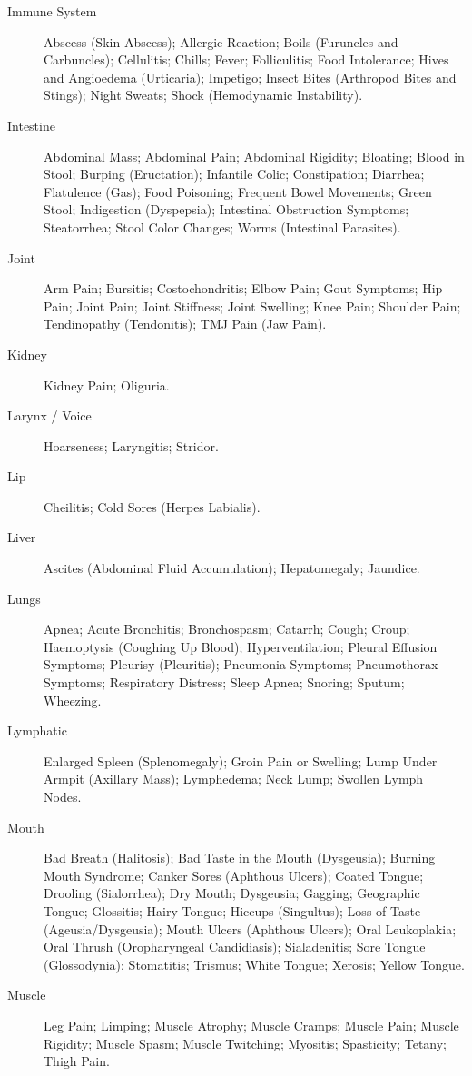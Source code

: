 \begin{description}
  \item[Immune System] Abscess (Skin Abscess); Allergic Reaction; Boils (Furuncles and Carbuncles); Cellulitis; Chills; Fever; Folliculitis; Food Intolerance; Hives and Angioedema (Urticaria); Impetigo; Insect Bites (Arthropod Bites and Stings); Night Sweats; Shock (Hemodynamic Instability).
  \item[Intestine] Abdominal Mass; Abdominal Pain; Abdominal Rigidity; Bloating; Blood in Stool; Burping (Eructation); Infantile Colic; Constipation; Diarrhea; Flatulence (Gas); Food Poisoning; Frequent Bowel Movements; Green Stool; Indigestion (Dyspepsia); Intestinal Obstruction Symptoms; Steatorrhea; Stool Color Changes; Worms (Intestinal Parasites).
  \item[Joint] Arm Pain; Bursitis; Costochondritis; Elbow Pain; Gout Symptoms; Hip Pain; Joint Pain; Joint Stiffness; Joint Swelling; Knee Pain; Shoulder Pain; Tendinopathy (Tendonitis); TMJ Pain (Jaw Pain).
  \item[Kidney] Kidney Pain; Oliguria.
  \item[Larynx / Voice] Hoarseness; Laryngitis; Stridor.
  \item[Lip] Cheilitis; Cold Sores (Herpes Labialis).
  \item[Liver] Ascites (Abdominal Fluid Accumulation); Hepatomegaly; Jaundice.
  \item[Lungs] Apnea; Acute Bronchitis; Bronchospasm; Catarrh; Cough; Croup; Haemoptysis (Coughing Up Blood); Hyperventilation; Pleural Effusion Symptoms; Pleurisy (Pleuritis); Pneumonia Symptoms; Pneumothorax Symptoms; Respiratory Distress; Sleep Apnea; Snoring; Sputum; Wheezing.
  \item[Lymphatic] Enlarged Spleen (Splenomegaly); Groin Pain or Swelling; Lump Under Armpit (Axillary Mass); Lymphedema; Neck Lump; Swollen Lymph Nodes.
  \item[Mouth] Bad Breath (Halitosis); Bad Taste in the Mouth (Dysgeusia); Burning Mouth Syndrome; Canker Sores (Aphthous Ulcers); Coated Tongue; Drooling (Sialorrhea); Dry Mouth; Dysgeusia; Gagging; Geographic Tongue; Glossitis; Hairy Tongue; Hiccups (Singultus); Loss of Taste (Ageusia/Dysgeusia); Mouth Ulcers (Aphthous Ulcers); Oral Leukoplakia; Oral Thrush (Oropharyngeal Candidiasis); Sialadenitis; Sore Tongue (Glossodynia); Stomatitis; Trismus; White Tongue; Xerosis; Yellow Tongue.
  \item[Muscle] Leg Pain; Limping; Muscle Atrophy; Muscle Cramps; Muscle Pain; Muscle Rigidity; Muscle Spasm; Muscle Twitching; Myositis; Spasticity; Tetany; Thigh Pain.

\end{description}
